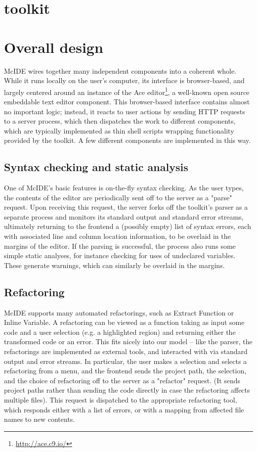 \section{\mclab toolkit}

\section{Overall design}

McIDE wires together many independent components into a coherent whole. While
it runs locally on the user's computer, its interface is browser-based, and
largely centered around an instance of the Ace
editor\footnote{\url{http://ace.c9.io/}}, a well-known open source embeddable
text editor component. This browser-based interface contains almost no
important logic; instead, it reacts to user actions by sending HTTP requests to
a server process, which then dispatches the work to different components, which
are typically implemented as thin shell scripts wrapping functionality provided
by the \mclab toolkit. A few different components are implemented in this way.

\subsection{Syntax checking and static analysis}

One of McIDE's basic features is on-the-fly syntax checking. As the user types,
the contents of the editor are periodically sent off to the server as a "parse"
request. Upon receiving this request, the server forks off the \mclab toolkit's
\matlab parser as a separate process and monitors its standard output and
standard error streams, ultimately returning to the frontend a (possibly empty)
list of syntax errors, each with associated line and column location
information, to be overlaid in the margins of the editor. If the parsing is
successful, the process also runs some simple static analyses, for instance
checking for uses of undeclared variables. These generate warnings, which can
similarly be overlaid in the margins.

\subsection{Refactoring}

McIDE supports many automated refactorings, such as Extract Function or Inline
Variable. A refactoring can be viewed as a function taking as input some code
and a user selection (e.g. a highlighted region) and returning either the
transformed code or an error. This fits nicely into our model -- like the
parser, the refactorings are implemented as external tools, and interacted with
via standard output and error streams. In particular, the user makes a
selection and selects a refactoring from a menu, and the frontend sends the
project path, the selection, and the choice of refactoring off to the server as
a "refactor" request. (It sends project paths rather than sending the code
directly in case the refactoring affects multiple files). This request is
dispatched to the appropriate refactoring tool, which responds either with a
list of errors, or with a mapping from affected file names to new contents.

